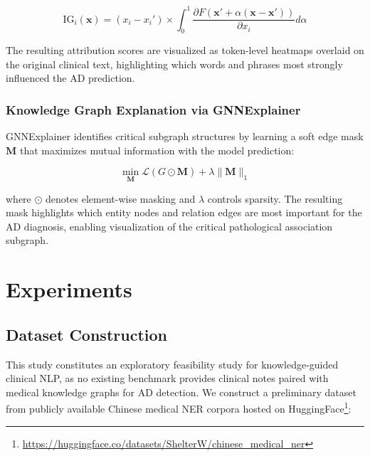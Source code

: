 \documentclass[11pt,onecolumn,a4paper]{article}
\begin{document}
\begin{equation}\label{eq:10}
    \text{IG}_i(\mathbf{x}) = (x_i - x_i') \times \int_0^1 \frac{\partial F(\mathbf{x}' + \alpha(\mathbf{x} - \mathbf{x}'))}{\partial x_i} d\alpha
\end{equation}

The resulting attribution scores are visualized as token-level heatmaps overlaid on the original clinical text, highlighting which words and phrases most strongly influenced the AD prediction.

\subsubsection{Knowledge Graph Explanation via GNNExplainer}

GNNExplainer \cite{ying2019gnnexplainer} identifies critical subgraph structures by learning a soft edge mask $\mathbf{M}$ that maximizes mutual information with the model prediction:

\begin{equation}\label{eq:11}
    \min_{\mathbf{M}} \mathcal{L}(G \odot \mathbf{M}) + \lambda \|\mathbf{M}\|_1
\end{equation}

where $\odot$ denotes element-wise masking and $\lambda$ controls sparsity. The resulting mask highlights which entity nodes and relation edges are most important for the AD diagnosis, enabling visualization of the critical pathological association subgraph.

\section{Experiments}
\label{sec:experiments}

\subsection{Dataset Construction}

This study constitutes an exploratory feasibility study for knowledge-guided clinical NLP, as no existing benchmark provides clinical notes paired with medical knowledge graphs for AD detection. We construct a preliminary dataset from publicly available Chinese medical NER corpora hosted on HuggingFace\footnote{\url{https://huggingface.co/datasets/ShelterW/chinese\_medical\_ner}}:
\end{document}
